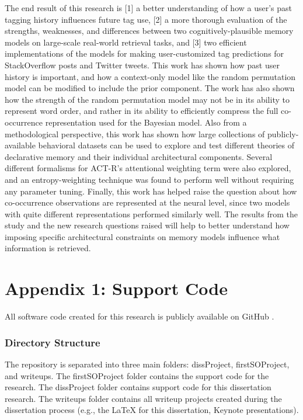 \documentclass[man,floatsintext,donotrepeattitle]{apa6}
\begin{document}
The end result of this research is [1] a better understanding of how a user's past tagging history influences future tag use,
[2] a more thorough evaluation of the strengths, weaknesses, and differences between two cognitively-plausible memory models on large-scale real-world retrieval tasks,
and [3] two efficient implementations of the models for making user-customized tag predictions for StackOverflow posts and Twitter tweets. 
This work has shown how past user history is important, and how a context-only model like the random permutation model can be modified to include the prior component.
The work has also shown how the strength of the random permutation model may not be in its ability to represent word order,
and rather in its ability to efficiently compress the full co-occurrence representation used for the Bayesian model.
Also from a methodological perspective,
this work has shown how large collections of publicly-available behavioral datasets can be used to explore and test different theories of declarative memory and their individual architectural components.
Several different formalisms for ACT-R's attentional weighting term were also explored, and an entropy-weighting technique was found to perform well without requiring any parameter tuning.
Finally, this work has helped raise the question about how co-occurrence observations are represented at the neural level, since two models with quite different representations performed similarly well.
The results from the study and the new research questions raised will help to better understand how imposing specific architectural constraints on memory models influence what information is retrieved.

\begingroup
{}
\setlength\bibitemsep{12pt}
\clearpage
\printbibliography[heading=bibintoc]
\endgroup

\clearpage
\section{Appendix 1: Support Code}

All software code created for this research is publicly available on GitHub \parencite{StanleyRepo2014}.

\subsubsection{Directory Structure}

The repository is separated into three main folders:
dissProject, firstSOProject, and writeups.
The firstSOProject folder contains the support code for the \textcite{Stanley2013} research.
The dissProject folder contains support code for this dissertation research.
The writeups folder contains all writeup projects created during the dissertation process (e.g., the LaTeX for this dissertation, Keynote presentations).
\end{document}
